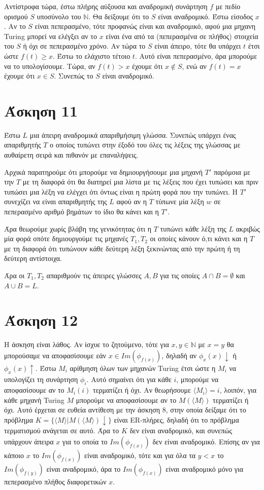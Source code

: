 \documentclass[a4paper, oneside, 11pt]{article}
\theoremstyle{definition}
\begin{document}
Αντίστροφα τώρα, έστω πλήρης αύξουσα και αναδρομική συνάρτηση $f$ με πεδίο ορισμού $S$
υποσύνολο του $\mathbb{N}$. Θα δείξουμε ότι το $S$ είναι αναδρομικό.
Έστω είσοδος $x$. 
Αν το $S$ είναι πεπερασμένο, τότε προφανώς είναι και αναδρομικό, αφού μια μηχανη Turing
μπορεί να ελέγξει αν το $x$ είναι ένα από τα (πεπερασμένα σε πλήθος) στοιχεία του $S$
ή όχι σε πεπερασμένο χρόνο. Αν τώρα το $S$ είναι άπειρο, τότε θα υπάρχει $t$ έτσι
ώστε $f(t) \geq x$. Έστω το ελάχιστο τέτοιο $t$. Αυτό είναι πεπερασμένο, άρα μπορούμε
να το υπολογίσουμε. Τώρα, αν $f(t) > x$ έχουμε ότι $x\notin S$, ενώ αν $f(t) = x$
έχουμε ότι $x\in S$. Συνεπώς το $S$ είναι αναδρομικό.

\section*{Άσκηση 11}

Έστω $L$ μια άπειρη αναδρομικά απαριθμήσιμη γλώσσα. Συνεπώς υπάρχει ένας απαριθμητής
$T$ ο οποίος τυπώνει στην έξοδό του όλες τις λέξεις της γλώσσας με αυθαίρετη σειρά
και πιθανόν με επαναλήψεις.

Αρχικά παρατηρούμε ότι μπορούμε να δημιουργήσουμε μια μηχανή $T'$ παρόμοια με την $T$
με τη διαφορά ότι θα διατηρεί μια λίστα με τις λέξεις που έχει τυπώσει και πριν
τυπώσει μια λέξη να ελέγχει ότι όντως είναι η πρώτη φορά που την τυπώνει. H $T'$
συνεχίζει να είναι απαριθμητής της $L$ αφού αν η $T$ τύπωνε μία λέξη $w$ σε
πεπερασμένο αριθμό βημάτων το ίδιο θα κάνει και η $T'$.

Άρα θεωρούμε χωρίς βλάβη της γενικότητας ότι η $T$ τυπώνει κάθε λέξη της $L$ ακριβώς
μία φορά οπότε δημιουργούμε τις μηχανές $T_1, T_2$ οι οποίες κάνουν ό,τι κάνει και η
$T$ με τη διαφορά ότι τυπώνουν κάθε δεύτερη λέξη ξεκινώντας από την πρώτη ή τη
δεύτερη αντίστοιχα.

Άρα οι $T_1, T_2$ απαριθμούν τις άπειρες γλώσσες $A, B$ για τις οποίες $A \cap B =
\emptyset$ και $A \cup B = L$.

\section*{Άσκηση 12}

Η άσκηση είναι λάθος. Αν ίσχυε το ζητούμενο, τότε για $x,y\in \mathbb{N}$ με $x=y$
θα μπορούσαμε να αποφασίσουμε εάν $x\in Im(\phi_{f(x)})$, δηλαδή αν
$\phi_x(x)\downarrow$ ή $\phi_x(x)\uparrow$. Έστω $M_i$ αρίθμηση όλων των μηχανών Turing
έτσι ώστε η $M_i$ να υπολογίζει τη συνάρτηση $\phi_i$. Αυτό σημαίνει ότι για κάθε $i$,
μπορούμε να αποφασίσουμε αν το $M_i(i)$ τερματίζει ή όχι. Αν θεωρήσουμε $\langle M_i\rangle=i$,
λοιπόν, για κάθε μηχανή Turing $M$ μπορούμε να αποφασίσουμε αν το $M(\langle M\rangle)$ τερματίζει
ή όχι. Αυτό έρχεται σε ευθεία αντίθεση με την άσκηση 8, στην οποία δείξαμε ότι το πρόβλημα
$K=\{\langle M\rangle | M(\langle M\rangle) \downarrow\}$ είναι ER-πλήρες, δηλαδή ότι το
πρόβλημα τερματισμού ανάγεται σε αυτό. Άρα το $K$ δεν είναι αναδρομικό, και συνεπώς υπάρχουν
άπειρα $x$ για το οποία το $Im(\phi_{f(x)})$ δεν είναι αναδρομικό. Επίσης αν για κάποιο
$x$ το $Im(\phi_{f(x)})$ είναι αναδρομικό, τότε και για όλα τα $y<x$ το $Im(\phi_{f(y)})$
είναι αναδρομικό, άρα το $Im(\phi_{f(x)})$ είναι αναδρομικό μόνο για πεπερασμένο πλήθος
διαφορετικών $x$.
\end{document}
